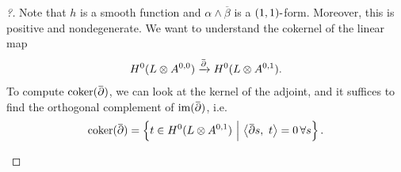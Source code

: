 \begin{proof}[?]
Note that \(h\) is a smooth function and
\(\alpha\wedge {\overline{{\beta}}}\) is a \((1, 1){\hbox{-}}\)form.
Moreover, this is positive and nondegenerate. We want to understand the
cokernel of the linear map
\begin{align*}
H^0(L \otimes A^{0, 0}) \xrightarrow{\mkern 1.5mu\overline{\mkern-1.5mu{\partial}\mkern-1.5mu}\mkern 1.5mu} H^0( L \otimes A^{0, 1})
.\end{align*}
To compute
\(\operatorname{coker}(\mkern 1.5mu\overline{\mkern-1.5mu{\partial}\mkern-1.5mu}\mkern 1.5mu)\),
we can look at the kernel of the adjoint, and it suffices to find the
orthogonal complement of
\(\operatorname{im}( \mkern 1.5mu\overline{\mkern-1.5mu{\partial}\mkern-1.5mu}\mkern 1.5mu)\),
i.e.~
\begin{align*}
\operatorname{coker}(\mkern 1.5mu\overline{\mkern-1.5mu{\partial}\mkern-1.5mu}\mkern 1.5mu) = \left\{{ t\in H^0(L\otimes A^{0, 1}) {~\mathrel{\Big|}~}{\left\langle {\mkern 1.5mu\overline{\mkern-1.5mu{\partial}\mkern-1.5mu}\mkern 1.5mus},~{t} \right\rangle} = 0 \, \forall s}\right\} 
.\end{align*}

\begin{figure}
\centering
{}
\end{figure}


\end{proof}

